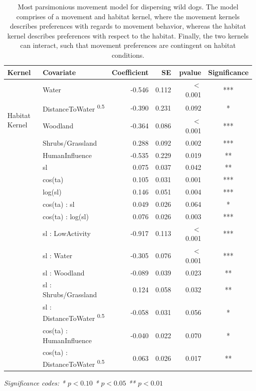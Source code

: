 \documentclass[abstract=on,10pt,a4paper,bibliography=totocnumbered]{article}
\begin{document}
\begin{table}
  \begin{center}
  \caption{Most parsimonious movement model for dispersing wild dogs. The model
  comprises of a movement and habitat kernel, where the movement kernels
  describes preferences with regards to movement behavior, whereas the habitat
  kernel describes preferences with respect to the habitat. Finally, the two
  kernels can interact, such that movement preferences are contingent on habitat
  conditions.}
  \label{MovementModelNumbers}
  \resizebox{\textwidth}{!} {
    \begin{threeparttable}
      \begin{tabular}{llrrrc}
        \toprule
        Kernel & Covariate & Coefficient & SE & pvalue & Significance \\
        \midrule
        \multirow{5}{*}{Habitat Kernel}
         & Water & -0.546 & 0.112 & \(<\) 0.001 & *** \\
         & DistanceToWater \textsuperscript{0.5} & -0.390 & 0.231 & 0.092 & * \\
         & Woodland & -0.364 & 0.086 & \(<\) 0.001 & *** \\
         & Shrubs/Grassland & 0.288 & 0.092 & 0.002 & *** \\
         & HumanInfluence & -0.535 & 0.229 & 0.019 & ** \\
        \hdashline
        \multirow{6}{*}{Movement Kernel}
         & sl & 0.075 & 0.037 & 0.042 & ** \\
         & cos(ta) & 0.105 & 0.031 & 0.001 & *** \\
         & log(sl) & 0.146 & 0.051 & 0.004 & *** \\
         & cos(ta) : sl & 0.049 & 0.026 & 0.064 & * \\
         & cos(ta) : log(sl) & 0.076 & 0.026 & 0.003 & *** \\
         & sl : LowActivity & -0.917 & 0.113 & \(<\) 0.001 & *** \\
        \hdashline
        \multirow{5}{*}{Interaction}
         & sl : Water & -0.305 & 0.076 & \(<\) 0.001 & *** \\
         & sl : Woodland & -0.089 & 0.039 & 0.023 & ** \\
         & sl : Shrubs/Grassland & 0.124 & 0.058 & 0.032 & ** \\
         & sl : DistanceToWater \textsuperscript{0.5} & -0.058 & 0.031 & 0.056 & * \\
         & cos(ta) : HumanInfluence & -0.040 & 0.022 & 0.070 & * \\
         & cos(ta) : DistanceToWater \textsuperscript{0.5} & 0.063 & 0.026 & 0.017 & ** \\
         \bottomrule
      \end{tabular}
       \begin{tablenotes}
         \item \textit{Significance codes: * \(p < 0.10\) \quad ** \(p < 0.05\)
         \quad *** \(p < 0.01\)}
       \end{tablenotes}
    \end{threeparttable}
    }
  \end{center}
\end{table}
\end{document}
